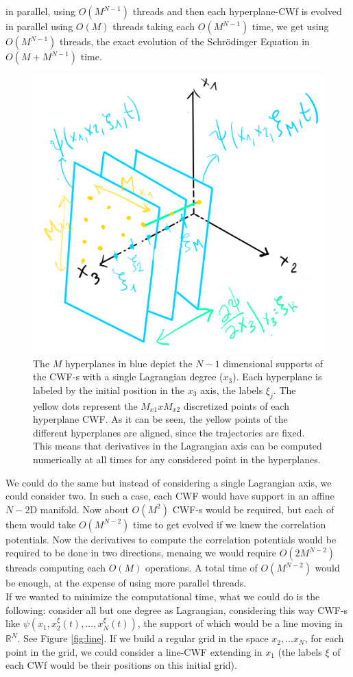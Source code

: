 \documentclass[11pt, a4paper]{article} %
\newcommand{\R}{\mathbb{R}} %
\DeclareRobustCommand{\mybox}[2][gray!20]{%
\begin{tcolorbox}[   %
        left=1cm,
        right=1cm,
        top=0.5cm,
        bottom=0.5cm,
        colback=#1,
        colframe=#1,
        width=\dimexpr\textwidth\relax, 
        enlarge left by=0mm,
        boxsep=5pt,
        arc=0pt,outer arc=0pt,
        ]
        #2
\end{tcolorbox}
}
\begin{document}
{in parallel, using $O(M^{N-1})$ threads and then each hyperplane-CWf is evolved in parallel using $O(M)$ threads taking each $O(M^{N-1})$ time, we get using $O(M^{N-1})$ threads, the exact evolution of the Schrödinger Equation in $O(M+M^{N-1})$ time.}

\begin{figure}[h!]
  \centering
    \includegraphics[width=0.5\linewidth]{hyperplaness.png}
  \caption{The $M$ hyperplanes in blue depict the $N-1$ dimensional supports of the CWF-s with a single Lagrangian degree ($x_3$). Each hyperplane is labeled by the initial position in the $x_3$ axis, the labels $\xi_j$. The yellow dots represent the $M_{x1}xM_{x2}$ discretized points of each hyperplane CWF. As it can be seen, the yellow points of the different hyperplanes are aligned, since the trajectories are fixed. This means that derivatives in the Lagrangian axis can be computed numerically at all times for any considered point in the hyperplanes.}
  \label{fig:hyperplane}
\end{figure}
\mybox{
We could do the same but instead of considering a single Lagrangian axis, we could consider two. In such a case, each CWF would have support in an affine $N-2$D manifold. Now about $O(M^2)$ CWF-s would be required, but each of them would take $O(M^{N-2})$ time to get evolved if we knew the correlation potentials. Now the derivatives to compute the correlation potentials would be required to be done in two directions, menaing we would require $O(2M^{N-2})$ threads computing each $O(M)$ operations. A total time of $O(M^{N-2})$ would be enough, at the expense of using more parallel threads.\\

If we wanted to minimize the computational time, what we could do is the following: consider all but one degree as Lagrangian, considering this way CWF-s like $\psi(x_1,x_2^\xi(t), ...,x_N^\xi(t))$, the support of which would be a line moving in $\R^N$. See Figure \ref{fig:line}. If we build a regular grid in the space $x_2,...x_N$, for each point in the grid, we could consider a line-CWF extending in $x_1$ (the labels $\xi$ of each CWf would be their positions on this initial grid).}
\end{document}
